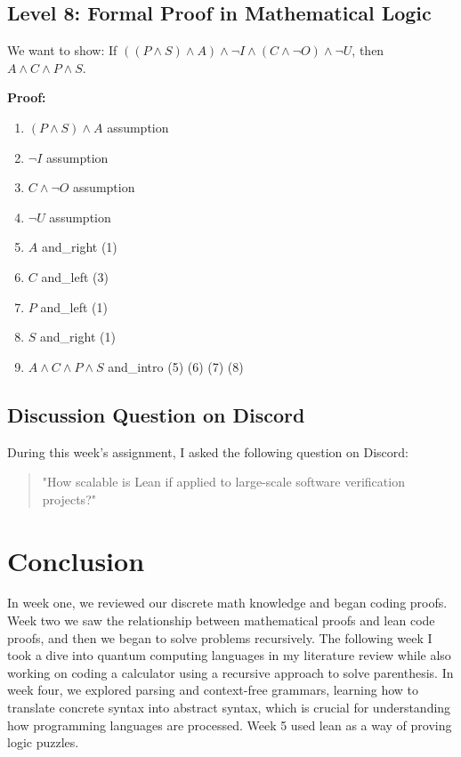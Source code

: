 \documentclass{article}
\begin{document}
\subsection*{Level 8: Formal Proof in Mathematical Logic}

We want to show: If \(((P \land S) \land A) \land \neg I \land (C \land \neg O) \land \neg U\), then \(A \land C \land P \land S\).

\textbf{Proof:}

\begin{enumerate}
    \item \( (P \land S) \land A \) \hfill assumption
    \item \( \neg I \) \hfill assumption
    \item \( C \land \neg O \) \hfill assumption
    \item \( \neg U \) \hfill assumption
    \item \( A \) \hfill and\_right (1)
    \item \( C \) \hfill and\_left (3)
    \item \( P \) \hfill and\_left (1)
    \item \( S \) \hfill and\_right (1)
    \item \( A \land C \land P \land S \) \hfill and\_intro (5) (6) (7) (8)
\end{enumerate}

\subsection*{Discussion Question on Discord}

During this week's assignment, I asked the following question on Discord:

\begin{quote}
\small
"How scalable is Lean if applied to large-scale software verification projects?"
\end{quote}


\section*{Conclusion}
In week one, we reviewed our discrete math knowledge and began coding proofs. Week two we saw the relationship between mathematical proofs and lean code proofs, and then we began to solve problems recursively. The following week I took a dive into quantum computing languages in my literature review while also working on coding a calculator using a recursive approach to solve parenthesis. In week four, we explored parsing and context-free grammars, learning how to translate concrete syntax into abstract syntax, which is crucial for understanding how programming languages are processed. Week 5 used lean as a way of proving logic puzzles.
\end{document}
